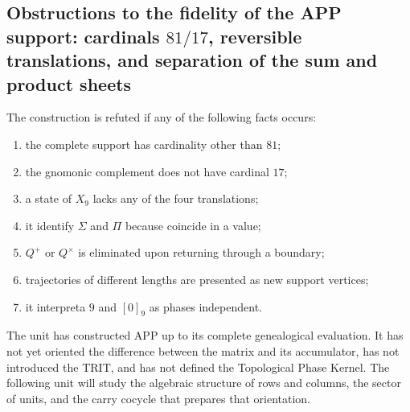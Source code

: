 \subsection{Obstructions to the fidelity of the APP support: cardinals \(81/17\), reversible translations, and separation of the sum and product sheets}

\begin{criterion}
The construction is refuted if any of the following facts
occurs:
\begin{enumerate}
 \item the complete support has cardinality other than \(81\);
 \item the gnomonic complement does not have cardinal \(17\);
 \item a state of \(X_9\) lacks any of the four translations;
 \item it identify \(\Sigma\) and \(\Pi\) because coincide in a value;
 \item \(Q^+\) or \(Q^\times\) is eliminated upon returning through a boundary;
 \item trajectories of different lengths are presented as new
       support vertices;
 \item it interpreta \(9\) and \([0]_9\) as phases independent.
\end{enumerate}
\end{criterion}

The unit has constructed APP up to its complete genealogical evaluation. It has not yet
oriented the difference between the matrix and its accumulator, has not
introduced the TRIT,
and has not defined the Topological Phase Kernel. The following unit will study
the algebraic structure of rows and columns, the sector of units, and the
carry cocycle that prepares that orientation.



